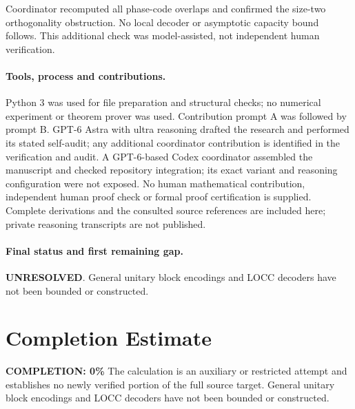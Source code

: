 \documentclass[11pt]{article}
\begin{document}
Coordinator recomputed all phase-code overlaps and confirmed the size-two orthogonality obstruction. No local decoder or asymptotic capacity bound follows. This additional check was model-assisted, not independent human verification.

\paragraph{Tools, process and contributions.}
Python 3 was used for file preparation and structural checks; no numerical experiment or theorem prover was used. Contribution prompt A was followed by prompt B. GPT-6 Astra with ultra reasoning drafted the research and performed its stated self-audit; any additional coordinator contribution is identified in the verification and audit. A GPT-6-based Codex coordinator assembled the manuscript and checked repository integration; its exact variant and reasoning configuration were not exposed. No human mathematical contribution, independent human proof check or formal proof certification is supplied. Complete derivations and the consulted source references are included here; private reasoning transcripts are not published.

\paragraph{Final status and first remaining gap.}
\textbf{UNRESOLVED}. General unitary block encodings and LOCC decoders have not been bounded or constructed.

\section{Completion Estimate}
\noindent\textbf{COMPLETION: 0\%}
The calculation is an auxiliary or restricted attempt and establishes no newly verified portion of the full source target. General unitary block encodings and LOCC decoders have not been bounded or constructed.
\end{document}
